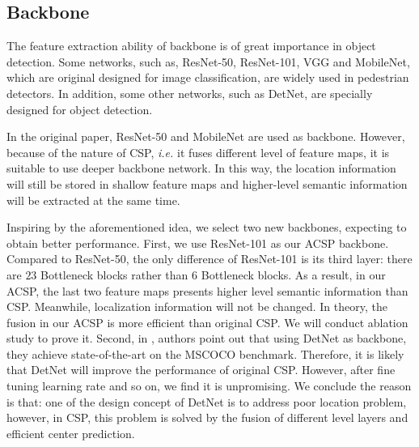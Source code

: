 \documentclass[twocolumn]{article}
\begin{document}
\subsection{Backbone}\label{BB}
The feature extraction ability of backbone is of great importance in object detection. Some networks, such as, ResNet-50\cite{luo2018differentiable}, ResNet-101\cite{luo2018differentiable},  VGG\cite{simonyan2014very} and MobileNet\cite{howard2017mobilenets}, which are original designed for image classification, are 
widely used in pedestrian detectors. In addition, some other networks, such as DetNet\cite{li2018detnet}, are specially designed for object detection.\par 
In the original paper\cite{liu2019high}, ResNet-50\cite{luo2018differentiable} and MobileNet\cite{howard2017mobilenets} are used as backbone. However, because of the nature of CSP\cite{liu2019high}, \textit{i.e.} it fuses different level of feature maps, it is suitable to use deeper backbone network. In this way, the location information will still be stored  in shallow feature maps and higher-level semantic information will be extracted at the same time.\par 
Inspiring by the aforementioned idea, we select two new backbones, expecting to obtain better performance. First, we use ResNet-101\cite{luo2018differentiable} as our ACSP backbone. Compared to ResNet-50\cite{luo2018differentiable}, the only difference of ResNet-101\cite{luo2018differentiable} is its third layer: there are $23$ Bottleneck blocks rather than $6$ Bottleneck blocks. As a result, in our ACSP, the last two feature maps presents higher level semantic information than CSP\cite{liu2019high}. Meanwhile, localization information will not be changed. In theory, the fusion in our ACSP is more efficient than original CSP\cite{liu2019high}. We will conduct ablation study to prove it. Second, in \cite{li2018detnet}, authors point out that using DetNet\cite{li2018detnet} as backbone, they achieve state-of-the-art on the MSCOCO benchmark\cite{lin2014microsoft}. Therefore, it is likely that DetNet\cite{li2018detnet} will improve the performance of original CSP\cite{liu2019high}. However, after fine tuning learning rate and so on, we find it is unpromising. We conclude the reason is that: one of the design concept of DetNet\cite{li2018detnet} is to address poor location problem, however, in CSP\cite{liu2019high}, this problem is solved by the fusion of different level layers and efficient center prediction.
\end{document}
